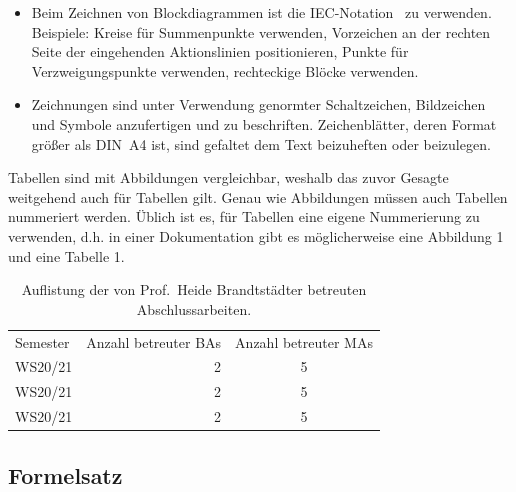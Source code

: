 \begin{itemize}
 \begin{figure}
    \centering
    
    \caption{Vergleich simulations- mit realem Verhalten}
    \label{fig: Vergleich Simulation mit realem verhalten}
\end{figure}

    \item Beim Zeichnen von Blockdiagrammen ist die IEC-Notation~\cite{IECControltech} zu verwenden. Beispiele: Kreise für Summenpunkte verwenden, Vorzeichen an der rechten Seite der eingehenden Aktionslinien positionieren, Punkte für Verzweigungspunkte verwenden, rechteckige Blöcke verwenden.
    \item Zeichnungen sind unter Verwendung genormter Schaltzeichen, Bildzeichen und Symbole anzufertigen und zu beschriften. Zeichenblätter, deren Format größer als DIN~A4 ist, sind gefaltet dem Text beizuheften oder beizulegen.
\end{itemize}

 
Tabellen sind mit Abbildungen vergleichbar, weshalb das zuvor Gesagte weitgehend auch für Tabellen gilt. Genau wie Abbildungen müssen auch Tabellen nummeriert werden. Üblich ist es, für Tabellen eine eigene Nummerierung zu verwenden, d.h. in einer Dokumentation gibt es möglicherweise eine Abbildung 1 und eine Tabelle 1.


\begin{table}[h]
    \centering
   \begin{tabular}{l|rc}
	Semester   &Anzahl betreuter BAs   & Anzahl betreuter MAs\\
    WS20/21     &2      &5\\
    WS20/21     &2      &5\\
    WS20/21     &2      &5\\
\end{tabular}
	\caption{Auflistung der von Prof.~Heide Brandtstädter betreuten Abschlussarbeiten.}
	\label{tab:BAsMas}
\end{table}


\subsection{Formelsatz }
\label{sec:formulas}



